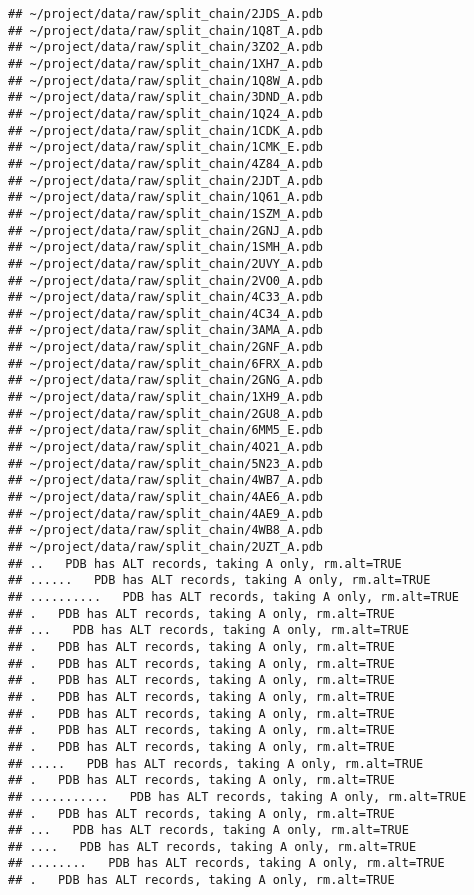 \documentclass[
]{article}
\begin{document}
\begin{verbatim}
## ~/project/data/raw/split_chain/2JDS_A.pdb
## ~/project/data/raw/split_chain/1Q8T_A.pdb
## ~/project/data/raw/split_chain/3ZO2_A.pdb
## ~/project/data/raw/split_chain/1XH7_A.pdb
## ~/project/data/raw/split_chain/1Q8W_A.pdb
## ~/project/data/raw/split_chain/3DND_A.pdb
## ~/project/data/raw/split_chain/1Q24_A.pdb
## ~/project/data/raw/split_chain/1CDK_A.pdb
## ~/project/data/raw/split_chain/1CMK_E.pdb
## ~/project/data/raw/split_chain/4Z84_A.pdb
## ~/project/data/raw/split_chain/2JDT_A.pdb
## ~/project/data/raw/split_chain/1Q61_A.pdb
## ~/project/data/raw/split_chain/1SZM_A.pdb
## ~/project/data/raw/split_chain/2GNJ_A.pdb
## ~/project/data/raw/split_chain/1SMH_A.pdb
## ~/project/data/raw/split_chain/2UVY_A.pdb
## ~/project/data/raw/split_chain/2VO0_A.pdb
## ~/project/data/raw/split_chain/4C33_A.pdb
## ~/project/data/raw/split_chain/4C34_A.pdb
## ~/project/data/raw/split_chain/3AMA_A.pdb
## ~/project/data/raw/split_chain/2GNF_A.pdb
## ~/project/data/raw/split_chain/6FRX_A.pdb
## ~/project/data/raw/split_chain/2GNG_A.pdb
## ~/project/data/raw/split_chain/1XH9_A.pdb
## ~/project/data/raw/split_chain/2GU8_A.pdb
## ~/project/data/raw/split_chain/6MM5_E.pdb
## ~/project/data/raw/split_chain/4O21_A.pdb
## ~/project/data/raw/split_chain/5N23_A.pdb
## ~/project/data/raw/split_chain/4WB7_A.pdb
## ~/project/data/raw/split_chain/4AE6_A.pdb
## ~/project/data/raw/split_chain/4AE9_A.pdb
## ~/project/data/raw/split_chain/4WB8_A.pdb
## ~/project/data/raw/split_chain/2UZT_A.pdb
## ..   PDB has ALT records, taking A only, rm.alt=TRUE
## ......   PDB has ALT records, taking A only, rm.alt=TRUE
## ..........   PDB has ALT records, taking A only, rm.alt=TRUE
## .   PDB has ALT records, taking A only, rm.alt=TRUE
## ...   PDB has ALT records, taking A only, rm.alt=TRUE
## .   PDB has ALT records, taking A only, rm.alt=TRUE
## .   PDB has ALT records, taking A only, rm.alt=TRUE
## .   PDB has ALT records, taking A only, rm.alt=TRUE
## .   PDB has ALT records, taking A only, rm.alt=TRUE
## .   PDB has ALT records, taking A only, rm.alt=TRUE
## .   PDB has ALT records, taking A only, rm.alt=TRUE
## .   PDB has ALT records, taking A only, rm.alt=TRUE
## .....   PDB has ALT records, taking A only, rm.alt=TRUE
## .   PDB has ALT records, taking A only, rm.alt=TRUE
## ...........   PDB has ALT records, taking A only, rm.alt=TRUE
## .   PDB has ALT records, taking A only, rm.alt=TRUE
## ...   PDB has ALT records, taking A only, rm.alt=TRUE
## ....   PDB has ALT records, taking A only, rm.alt=TRUE
## ........   PDB has ALT records, taking A only, rm.alt=TRUE
## .   PDB has ALT records, taking A only, rm.alt=TRUE

\end{verbatim}
\end{document}
